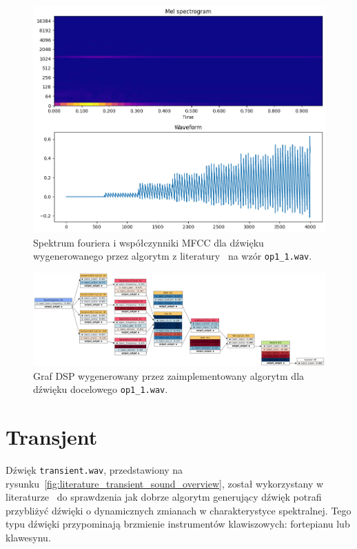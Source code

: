 \begin{multicols}{3}
\begin{figure}[H]
    \centering
    \includegraphics[width=0.9\linewidth]{rys06/macret_evolved_op1.png}
    \caption{
      Spektrum fouriera i współczynniki MFCC dla dźwięku wygenerowanego
      przez algorytm z literatury~\cite{evolutionary_puredata} na wzór \texttt{op1\_1.wav}.
    }\label{fig:evolved_literature_op1_sound_overview}
\end{figure}
\end{multicols}

\begin{figure}
    \centering
    \includegraphics[angle=90,width=0.45\linewidth]{rys06/evolved_graph_op1.png}
    \caption{
      Graf DSP wygenerowany przez zaimplementowany algorytm
      dla dźwięku docelowego \texttt{op1\_1.wav}.
    }\label{fig:evolved_graph_op1}
\end{figure}

\newpage

\section{Transjent}

Dźwięk \texttt{transient.wav}, przedstawiony na rysunku~\ref{fig:literature_transient_sound_overview},
został wykorzystany w literaturze~\cite{evolutionary_puredata} do sprawdzenia jak dobrze algorytm
generujący dźwięk potrafi przybliżyć dźwięki o dynamicznych zmianach w charakterystyce spektralnej.
Tego typu dźwięki przypominają brzmienie instrumentów klawiszowych: fortepianu lub klawesynu.

